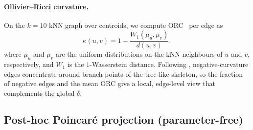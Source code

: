 \documentclass{article}
\begin{document}
\paragraph{Ollivier--Ricci curvature.} On the $k{=}10$ kNN graph over centroids, we compute ORC~\citep{ollivier2009ricci} per edge as
\begin{equation}
\kappa(u,v) = 1 - \frac{W_1(\mu_u, \mu_v)}{d(u, v)},
\end{equation}
where $\mu_u$ and $\mu_v$ are the uniform distributions on the kNN neighbours of $u$ and $v$, respectively, and $W_1$ is the $1$-Wasserstein distance. Following \citet{ollivier2009ricci}, negative-curvature edges concentrate around branch points of the tree-like skeleton, so the fraction of negative edges and the mean ORC give a local, edge-level view that complements the global $\delta$.

\subsection{Post-hoc Poincar\'{e} projection (parameter-free)}
\label{sec:projection}
\end{document}
